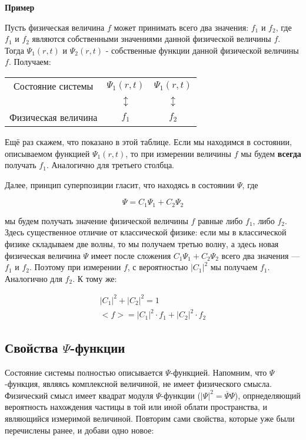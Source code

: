 \documentclass[a4paper,14pt]{article}
\newcommand{\mysubsection}[1]{\subsection*{#1}
\addcontentsline{toc}{subsection}{#1}}
\begin{document}
\begin{center}
	\textbf{Пример}
\end{center}

Пусть физическая величина $f$ может принимать всего два значения: $f_1$ и $f_2$, где 
$f_1$ и $f_2$ являются собственными значениями данной физической величины $f$. Тогда $\Psi_1(r,t)$ и $\Psi_2(r,t)$ - собственные функции данной физической величины $f$. Получаем:

\begin{center}
\begin{tabular}{  c | c | c  }
	Состояние системы & $\Psi_1(r,t)$ & $\Psi_1(r,t)$ \\
	 & $\updownarrow$ & $\updownarrow$ \\
	 Физическая величина & $f_1$ & $f_2$
\end{tabular}
\end{center}

Ещё раз скажем, что показано в этой таблице. Если мы находимся в состоянии, описываемом функцией $\Psi_1(r,t)$, то при измерении величины $f$ мы будем \textbf{всегда} получать $f_1$. Аналогично для третьего столбца.

Далее, принцип суперпозиции гласит, что находясь в состоянии $\Psi$, где

\[\Psi = C_1\Psi_1 + C_2\Psi_2\]

мы будем получать значение физической величины $f$ равные либо $f_1$, либо $f_2$. Здесь существенное отличие от классической физике: если мы в классической физике складываем две волны, то мы получаем третью волну, а здесь новая физическая величина $\Psi$ имеет после сложения $C_1\Psi_1 + C_2\Psi_2$ всего два значения --- $f_1$ и $f_2$. Поэтому при измерении $f$, с вероятностью $|C_1|^2$ мы получаем $f_1$. Аналогично для $f_2$. К тому же:

\begin{gather*}
	|C_1|^2 + |C_2|^2 = 1 \\
	<f> = |C_1|^2 \cdot f_1 + |C_2|^2 \cdot f_2
\end{gather*}

\mysubsection{Свойства $\Psi$-функции}

Состояние системы полностью описывается $\Psi$-функцией. Напомним, что $\Psi$-функция, являясь комплексной величиной, не имеет физического смысла. Физический смысл имеет квадрат модуля $\Psi$-функции ($|\Psi|^2 = \overline \Psi \Psi$), опрнеделяющий вероятность нахождения частицы в той или иной облати пространства, и являющийся измеримой величиной. Повторим сами свойства, которые уже были перечислены ранее, и добави одно новое:
\end{document}
